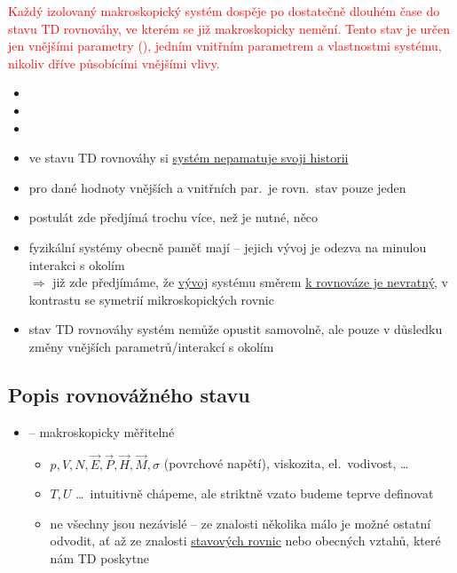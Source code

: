 \begin{veta}[Postulát]
\textcolor{Red}{Každý izolovaný makroskopický systém dospěje po dostatečně dlouhém čase do stavu TD rovnováhy, ve kterém se již makroskopicky nemění. Tento stav je určen jen vnějšími parametry (), jedním vnitřním parametrem a vlastnostmi systému, nikoliv dříve působícími vnějšími vlivy.}
\begin{itemize}[nosep]
  \item[--] 
  \item[--] 
  \item[--] 
\end{itemize}
\end{veta}

\begin{itemize}[label=$\Rightarrow$]
  \item ve stavu TD rovnováhy si \underline{systém nepamatuje svoji historii}
  \item pro dané hodnoty vnějších a vnitřních par.\ je rovn.\ stav pouze jeden
  \item postulát zde předjímá trochu více, než je nutné, něco 
\end{itemize}
\begin{itemize}
  \item[--] fyzikální systémy obecně paměť mají -- jejich vývoj je odezva na minulou interakci s okolím \\
        $\Rightarrow$ již zde předjímáme, že \underline{vývoj} systému směrem \underline{k rovnováze je nevratný}, v kontrastu se symetrií mikroskopických rovnic
  \item[--] stav TD rovnováhy systém nemůže opustit samovolně, ale pouze v důsledku změny vnějších parametrů/interakcí s okolím
\end{itemize}

\subsection{Popis rovnovážného stavu}
\begin{itemize}
  \item[--]  -- makroskopicky měřitelné
  \begin{itemize}
    \item $p, V, N, \vec E, \vec P, \vec H, \vec M, \sigma$ (povrchové napětí), viskozita, el.\ vodivost, \dots
    \item $T, U$ \dots\ intuitivně chápeme, ale striktně vzato budeme teprve definovat
    \item ne všechny jsou nezávislé -- ze znalosti několika málo je možné ostatní odvodit, ať až ze znalosti \underline{stavových rovnic} nebo obecných vztahů, které nám TD poskytne
  \end{itemize}
\end{itemize}

